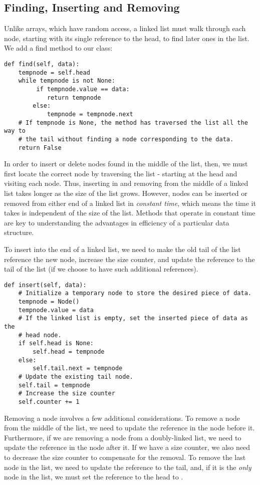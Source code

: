 \subsection*{Finding, Inserting and Removing}
Unlike arrays, which have random access, a linked list must walk through each node, starting with its single reference to the head, to find later ones in the list.
We add a find method to our  class:
\begin{lstlisting}
def find(self, data):
    tempnode = self.head
    while tempnode is not None:
         if tempnode.value == data:
            return tempnode
        else:
            tempnode = tempnode.next
    # If tempnode is None, the method has traversed the list all the way to
    # the tail without finding a node corresponding to the data.
    return False
\end{lstlisting}

In order to insert or delete nodes found in the middle of the list, then, we must first locate the correct node by traversing the list - starting at the head and visiting each node.
Thus, inserting in and removing from the middle of a linked list takes longer as the size of the list grows.
However, nodes can be inserted or removed from either end of a linked list in \emph{constant time}, which means the time it takes is independent of the size of the list.
Methods that operate in constant time are key to understanding the advantages in efficiency of a particular data structure.

To insert into the end of a linked list, we need to make the old tail of the list reference the new node, increase the size counter, and update the reference to the tail of the list (if we choose to have such additional references).

\begin{lstlisting}
def insert(self, data):
    # Initialize a temporary node to store the desired piece of data.
    tempnode = Node()
    tempnode.value = data
    # If the linked list is empty, set the inserted piece of data as the
    # head node.
    if self.head is None:
        self.head = tempnode
    else:
        self.tail.next = tempnode
    # Update the existing tail node.
    self.tail = tempnode
    # Increase the size counter
    self.counter += 1
\end{lstlisting}

Removing a node involves a few additional considerations.
To remove a node from the middle of the list, we need to update the  reference in the node before it.
Furthermore, if we are removing a node from a doubly-linked list, we need to update the  reference in the node after it.
If we have a size counter, we also need to decrease the size counter to compensate for the removal.
To remove the last node in the list, we need to update the reference to the tail, and, if it is the \emph{only} node in the list, we must set the reference to the head to .

